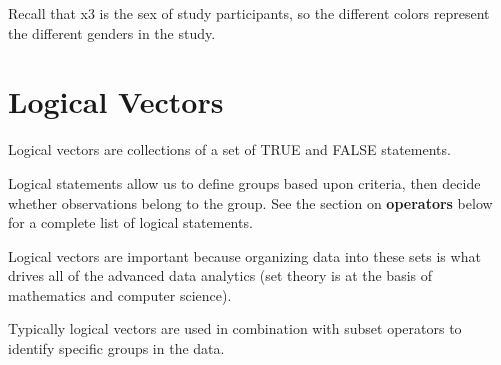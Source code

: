 \documentclass[]{book}
\newenvironment{Shaded}{\begin{snugshade}}{\end{snugshade}}
\newcommand{\CommentTok}[1]{\textcolor[rgb]{0.56,0.35,0.01}{\textit{#1}}}
\newcommand{\DecValTok}[1]{\textcolor[rgb]{0.00,0.00,0.81}{#1}}
\newcommand{\NormalTok}[1]{#1}
\newcommand{\OperatorTok}[1]{\textcolor[rgb]{0.81,0.36,0.00}{\textbf{#1}}}
\newcommand{\StringTok}[1]{\textcolor[rgb]{0.31,0.60,0.02}{#1}}
\theoremstyle{definition}
\theoremstyle{definition}
\theoremstyle{definition}
\theoremstyle{remark}
\begin{document}
Recall that x3 is the sex of study participants, so the different colors
represent the different genders in the study.

\hypertarget{logical-vectors}{%
\section{Logical Vectors}\label{logical-vectors}}

Logical vectors are collections of a set of TRUE and FALSE statements.

Logical statements allow us to define groups based upon criteria, then
decide whether observations belong to the group. See the section on
\textbf{operators} below for a complete list of logical statements.

Logical vectors are important because organizing data into these sets is
what drives all of the advanced data analytics (set theory is at the
basis of mathematics and computer science).

\begin{Shaded}
\end{Shaded}

Typically logical vectors are used in combination with subset operators
to identify specific groups in the data.

\begin{Shaded}
\end{Shaded}
\end{document}
